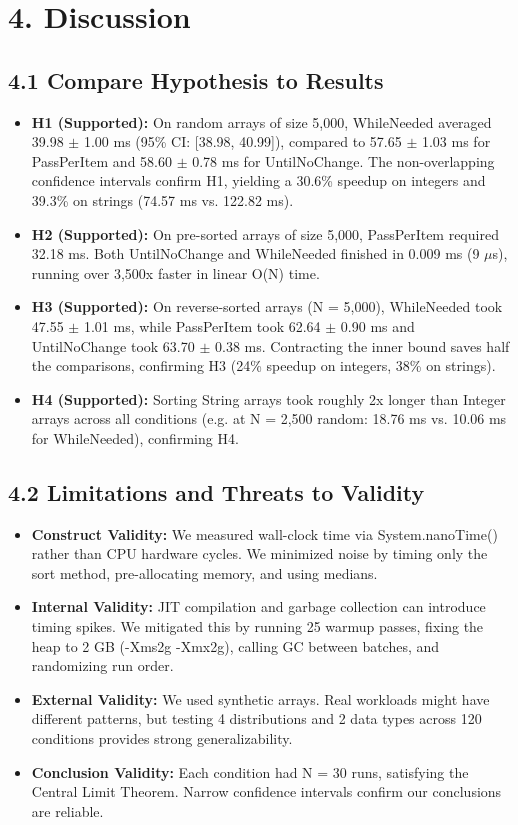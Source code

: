 \documentclass[10pt,a4paper]{article}
\begin{document}
\newpage
\section*{4. Discussion}

\subsection*{4.1 Compare Hypothesis to Results}
\begin{itemize}
    \item \textbf{H1 (Supported):} On random arrays of size 5,000, WhileNeeded averaged 39.98 $\pm$ 1.00 ms (95\% CI: [38.98, 40.99]), compared to 57.65 $\pm$ 1.03 ms for PassPerItem and 58.60 $\pm$ 0.78 ms for UntilNoChange. The non-overlapping confidence intervals confirm H1, yielding a 30.6\% speedup on integers and 39.3\% on strings (74.57 ms vs. 122.82 ms).
    \item \textbf{H2 (Supported):} On pre-sorted arrays of size 5,000, PassPerItem required 32.18 ms. Both UntilNoChange and WhileNeeded finished in 0.009 ms (9 $\mu$s), running over 3,500x faster in linear O(N) time.
    \item \textbf{H3 (Supported):} On reverse-sorted arrays (N = 5,000), WhileNeeded took 47.55 $\pm$ 1.01 ms, while PassPerItem took 62.64 $\pm$ 0.90 ms and UntilNoChange took 63.70 $\pm$ 0.38 ms. Contracting the inner bound saves half the comparisons, confirming H3 (24\% speedup on integers, 38\% on strings).
    \item \textbf{H4 (Supported):} Sorting String arrays took roughly 2x longer than Integer arrays across all conditions (e.g. at N = 2,500 random: 18.76 ms vs. 10.06 ms for WhileNeeded), confirming H4.
\end{itemize}

\subsection*{4.2 Limitations and Threats to Validity}
\begin{itemize}
    \item \textbf{Construct Validity:} We measured wall-clock time via System.nanoTime() rather than CPU hardware cycles. We minimized noise by timing only the sort method, pre-allocating memory, and using medians.
    \item \textbf{Internal Validity:} JIT compilation and garbage collection can introduce timing spikes. We mitigated this by running 25 warmup passes, fixing the heap to 2 GB (-Xms2g -Xmx2g), calling GC between batches, and randomizing run order.
    \item \textbf{External Validity:} We used synthetic arrays. Real workloads might have different patterns, but testing 4 distributions and 2 data types across 120 conditions provides strong generalizability.
    \item \textbf{Conclusion Validity:} Each condition had N = 30 runs, satisfying the Central Limit Theorem. Narrow confidence intervals confirm our conclusions are reliable.
\end{itemize}
\end{document}
